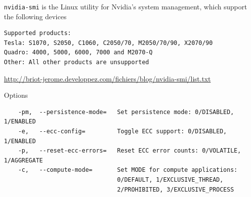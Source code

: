 \verb!nvidia-smi! is the Linux utility for Nvidia's system management,
which support the following devices
\begin{verbatim}
Supported products:
Tesla: S1070, S2050, C1060, C2050/70, M2050/70/90, X2070/90
Quadro: 4000, 5000, 6000, 7000 and M2070-Q
Other: All other products are unsupported
\end{verbatim}
\url{http://briot-jerome.developpez.com/fichiers/blog/nvidia-smi/list.txt}

Options
\begin{verbatim}
    -pm,  --persistence-mode=   Set persistence mode: 0/DISABLED, 1/ENABLED
    -e,   --ecc-config=         Toggle ECC support: 0/DISABLED, 1/ENABLED
    -p,   --reset-ecc-errors=   Reset ECC error counts: 0/VOLATILE, 1/AGGREGATE
    -c,   --compute-mode=       Set MODE for compute applications:
                                0/DEFAULT, 1/EXCLUSIVE_THREAD,
                                2/PROHIBITED, 3/EXCLUSIVE_PROCESS
\end{verbatim}

